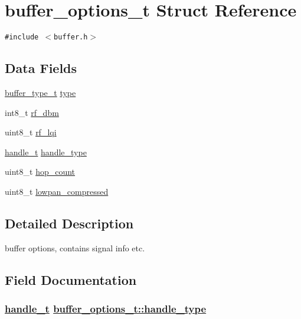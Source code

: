 \hypertarget{structbuffer__options__t}{
\section{buffer\_\-options\_\-t Struct Reference}
\label{structbuffer__options__t}
}
{\tt \#include $<$buffer.h$>$}

\subsection*{Data Fields}
\begin{CompactItemize}
\item 
\hyperlink{buffer_8h_1ee2fd526bf1d6e6d892b10466c7e725}{buffer\_\-type\_\-t} \hyperlink{structbuffer__options__t_d445f5550a95e734c8598f77a98147a5}{type}
\item 
int8\_\-t \hyperlink{structbuffer__options__t_7ab085df01d06758397a0a20ae7e456e}{rf\_\-dbm}
\item 
uint8\_\-t \hyperlink{structbuffer__options__t_2aec4493d07fae7bb2801231085d1bcb}{rf\_\-lqi}
\item 
\hyperlink{buffer_8h_03eee9524252e108b2762c560b60da9b}{handle\_\-t} \hyperlink{structbuffer__options__t_8b4126f357282f246c62623a7c04a0d5}{handle\_\-type}
\item 
uint8\_\-t \hyperlink{structbuffer__options__t_f6af386458431a08a8b738dd3836a3c6}{hop\_\-count}
\item 
uint8\_\-t \hyperlink{structbuffer__options__t_4ee6fc95c4cf1f37cf59c66a3f7984e5}{lowpan\_\-compressed}
\end{CompactItemize}


\subsection{Detailed Description}
buffer options, contains signal info etc. 



\subsection{Field Documentation}
\hypertarget{structbuffer__options__t_8b4126f357282f246c62623a7c04a0d5}{
\subsubsection[handle\_\-type]{\setlength{\rightskip}{0pt plus 5cm}\hyperlink{buffer_8h_03eee9524252e108b2762c560b60da9b}{handle\_\-t} \hyperlink{structbuffer__options__t_8b4126f357282f246c62623a7c04a0d5}{buffer\_\-options\_\-t::handle\_\-type}}}
\label{structbuffer__options__t_8b4126f357282f246c62623a7c04a0d5}


